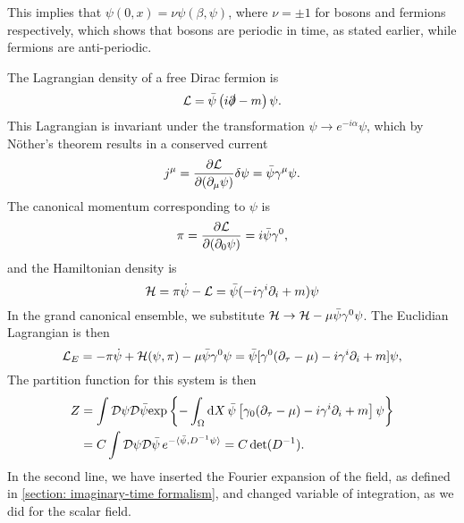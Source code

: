 This implies that $\psi(0, x) = \nu \psi(\beta, \psi)$, where $\nu = \pm 1$ for bosons and fermions respectively, which shows that bosons are periodic in time, as stated earlier, while fermions are anti-periodic.


The Lagrangian density of a free Dirac fermion is
%
\begin{equation}
    \mathcal{L} = \bar \psi \left( i \slashed{\partial} - m \right) \psi.
\end{equation}
%
This Lagrangian is invariant under the transformation $\psi \rightarrow e^{-i \alpha} \psi$, which by Nöther's theorem results in a conserved current
%
\begin{equation}
    j^\mu = \pdv{\mathcal{L}}{(\partial_\mu \psi)} \delta \psi=  \bar \psi \gamma^\mu \psi.
\end{equation}
%
The canonical momentum corresponding to $\psi$ is
%
\begin{equation}
    \pi = \pdv{\mathcal{L}}{(\partial_0 \psi)} = i \bar \psi \gamma^0,
\end{equation}
%
and the Hamiltonian density is 
%
\begin{equation}
    \mathcal{H} = \pi \dot\psi - \mathcal{L}
    = \bar \psi (-i\gamma^i\partial_i + m) \psi
\end{equation}
%
In the grand canonical ensemble, we substitute $\mathcal{H} \rightarrow \mathcal{H} - \mu \bar \psi \gamma^0 \psi$.
The Euclidian Lagrangian is then
%
\begin{equation}
    \mathcal{L}_E = 
    - \pi \dot\psi + \mathcal{H}(\psi, \pi) - \mu \bar \psi \gamma^0 \psi
    = \bar\psi[\gamma^0 (\partial_\tau - \mu) - i\gamma^i \partial_i + m] \psi,
\end{equation}
%
The partition function for this system is then~\autocite{laineBasicsThermalField2016}
%
\begin{align*}
    Z & = \int \mathcal D \psi \mathcal D \bar \psi
    \text{exp} \left\{ 
        - \int_\Omega \text{d} X \, \bar \psi
        \left[
            \gamma_0(\partial_\tau -\mu) -  i \gamma^i \partial_i + m
        \right]
        \psi
     \right\}\\
    & = C \int \mathcal D \psi \mathcal D {\bar \psi} \,
    e^{- \langle  {\bar \psi}, D^{-1} \psi\rangle} 
    = C \det(D^{-1}).
\end{align*}
In the second line, we have inserted the Fourier expansion of the field, as defined in \autoref{section: imaginary-time formalism}, and changed variable of integration, as we did for the scalar field.
